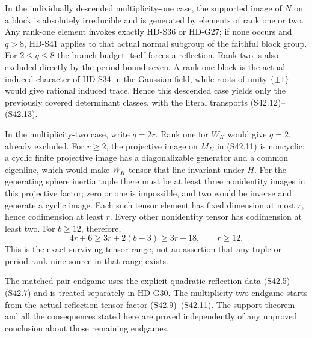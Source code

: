In the individually descended multiplicity-one case, the
supported image of \(N\) on a block is absolutely
irreducible and is generated by elements of rank one or two.
Any rank-one element invokes exactly HD-S36 or HD-G27; if
none occurs and \(q>8\), HD-S41 applies to that actual
normal subgroup of the faithful block group. For \(2\le q\le8\)
the branch budget itself forces a reflection. Rank two is
also excluded directly by the period bound seven. A rank-one
block is the actual induced character of HD-S34 in the
Gaussian field, while roots of unity \(\{\pm1\}\) would
give rational induced trace. Hence this descended case yields
only the previously covered determinant classes, with the
literal transports (S42.12)--(S42.13).

In the multiplicity-two case, write \(q=2r\). Rank one
for \(W_K\) would give \(q=2\), already excluded. For
\(r\ge2\), the projective image on \(M_K\) in
(S42.11) is noncyclic: a cyclic finite projective image has
a diagonalizable generator and a common eigenline, which
would make \(W_K\) tensor that line invariant under \(H\).
For the generating sphere inertia tuple there must be at
least three nonidentity images in this projective factor;
zero or one is impossible, and two would be inverse and
generate a cyclic image. Each such tensor element has fixed
dimension at most \(r\), hence codimension at least \(r\).
Every other nonidentity tensor has codimension at least two.
For \(b\ge12\), therefore,
\[
                4r+6\ge3r+2(b-3)\ge3r+18,
                              \qquad r\ge12.               \tag{S42.15}
\]
This is the exact surviving tensor range, not an assertion
that any tuple or period-rank-nine source in that range exists.

The matched-pair endgame uses the explicit quadratic reflection
data (S42.5)--(S42.7) and is treated separately in HD-G30.
The multiplicity-two endgame starts from the actual reflection
tensor factor (S42.9)--(S42.11). The support theorem and all
the consequences stated here are proved independently of any
unproved conclusion about those remaining endgames.
